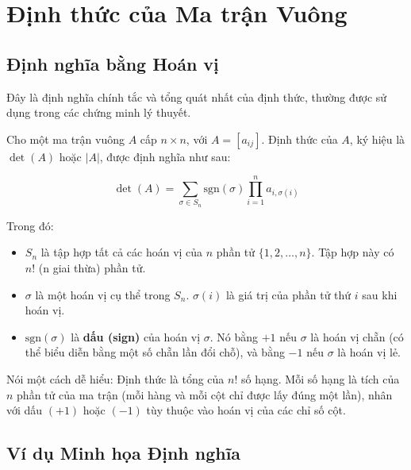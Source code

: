 
\chapter{Định thức của Ma trận Vuông}
\label{chuong:dinhthuc}

\section{Định nghĩa bằng Hoán vị}

Đây là định nghĩa chính tắc và tổng quát nhất của định thức, thường được sử dụng trong các chứng minh lý thuyết.

\begin{dinhnghia}
Cho một ma trận vuông $A$ cấp $n \times n$, với $A = [a_{ij}]$. Định thức của $A$, ký hiệu là $\det(A)$ hoặc $|A|$, được định nghĩa như sau:

\begin{equation}
\label{eq:det_leibniz}
\det(A) = \sum_{\sigma \in S_n} \text{sgn}(\sigma) \prod_{i=1}^n a_{i, \sigma(i)}
\end{equation}

Trong đó:
\begin{itemize}
    \item $S_n$ là tập hợp tất cả các hoán vị của $n$ phần tử $\{1, 2, \dots, n\}$. Tập hợp này có $n!$ (n giai thừa) phần tử.
    \item $\sigma$ là một hoán vị cụ thể trong $S_n$. $\sigma(i)$ là giá trị của phần tử thứ $i$ sau khi hoán vị.
    \item $\text{sgn}(\sigma)$ là \textbf{dấu (sign)} của hoán vị $\sigma$. Nó bằng $+1$ nếu $\sigma$ là hoán vị chẵn (có thể biểu diễn bằng một số chẵn lần đổi chỗ), và bằng $-1$ nếu $\sigma$ là hoán vị lẻ.
\end{itemize}
\end{dinhnghia}

\begin{note}
Nói một cách dễ hiểu: Định thức là tổng của $n!$ số hạng. Mỗi số hạng là tích của $n$ phần tử của ma trận (mỗi hàng và mỗi cột chỉ được lấy đúng một lần), nhân với dấu $(+1)$ hoặc $(-1)$ tùy thuộc vào hoán vị của các chỉ số cột.
\end{note}

\section{Ví dụ Minh họa Định nghĩa}

